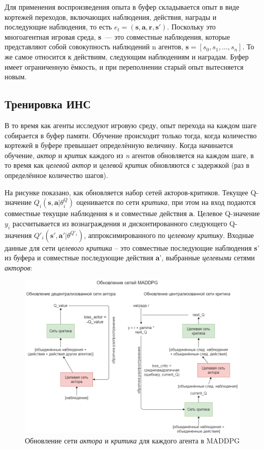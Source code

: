 Для применения воспроизведения опыта в буфер складывается опыт в виде кортежей переходов, включающих наблюдения, действия, награды и последующие наблюдения, то есть ${e_t = (\mathbf{s, a, r, s'})}$. Поскольку это многоагентная игровая среда, \textbf{s}~--- это совместные наблюдения, которые представляют собой совокупность наблюдений n агентов, ${\mathbf{s} = [s_0, s_1, ..., s_n]}$. То же самое относится к действиям, следующим наблюдениям и наградам. Буфер имеет ограниченную ёмкость, и при переполнении старый опыт вытесняется новым.

\subsection{Тренировка ИНС}

В то время как агенты исследуют игровую среду, опыт перехода на каждом шаге собирается в буфер памяти. Обучение происходит только тогда, когда количество кортежей в буфере превышает определённую величину. Когда начинается обучение, \textit{актор} и \textit{критик} каждого из \textit{n} агентов обновляется на каждом шаге, в то время как \textit{целевой актор} и \textit{целевой критик} обновляются с задержкой (раз в определённое количество шагов).

На рисунке  показано, как обновляется набор сетей акторов-критиков. Текущее Q-значение $Q_i(\mathbf{s, a}|\theta ^Q_i)$ оценивается по сети \textit{критика}, при этом на вход подаются совместные текущие наблюдения \textbf{s} и совместные действия \textbf{a}. Целевое Q-значение $y_i$ рассчитывается из вознаграждения и дисконтированного следующего Q-значения $Q'_i(\mathbf{s', a'}|\theta ^{Q'_i})$, аппроксимированного по \textit{целевому критику}. Входные данные для сети \textit{целевого критика} – это совместные последующие наблюдения \textbf{s}' из буфера и совместные последующие действия \textbf{a}', выбранные \textit{целевыми} сетями \textit{акторов}:

\begin{figure}[ht!]
    \center
    \includegraphics [scale=0.5] {my_folder/images/ch3/maddpg-updating-networks.png}
    \caption{Обновление сети \textit{актора} и \textit{критика} для каждого агента в MADDPG}
    \label{fig:ch3-network-training}
\end{figure}

